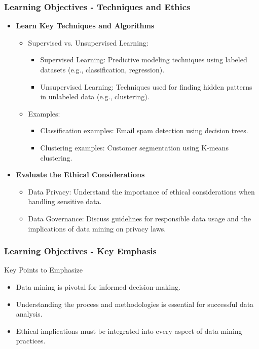 \documentclass{beamer}
\begin{document}
\begin{frame}[fragile]
    \frametitle{Learning Objectives - Techniques and Ethics}
    \begin{itemize}
        \item \textbf{Learn Key Techniques and Algorithms}
            \begin{itemize}
                \item Supervised vs. Unsupervised Learning:
                \begin{itemize}
                    \item Supervised Learning: Predictive modeling techniques using labeled datasets (e.g., classification, regression).
                    \item Unsupervised Learning: Techniques used for finding hidden patterns in unlabeled data (e.g., clustering).
                \end{itemize}
                \item Examples:
                \begin{itemize}
                    \item Classification examples: Email spam detection using decision trees.
                    \item Clustering examples: Customer segmentation using K-means clustering.
                \end{itemize}
            \end{itemize}
        \item \textbf{Evaluate the Ethical Considerations}
            \begin{itemize}
                \item Data Privacy: Understand the importance of ethical considerations when handling sensitive data.
                \item Data Governance: Discuss guidelines for responsible data usage and the implications of data mining on privacy laws.
            \end{itemize}
    \end{itemize}
\end{frame}

\begin{frame}[fragile]
    \frametitle{Learning Objectives - Key Emphasis}
    \begin{block}{Key Points to Emphasize}
        \begin{itemize}
            \item Data mining is pivotal for informed decision-making.
            \item Understanding the process and methodologies is essential for successful data analysis.
            \item Ethical implications must be integrated into every aspect of data mining practices.
        \end{itemize}
    \end{block}
\end{frame}
\end{document}
